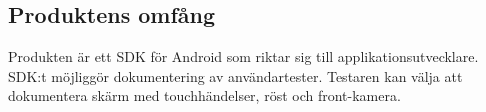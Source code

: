 \subsection{Produktens omfång}
Produkten är ett SDK för Android som riktar sig till applikationsutvecklare. SDK:t möjliggör dokumentering av användartester. Testaren kan välja att dokumentera skärm med touchhändelser, röst och front-kamera.